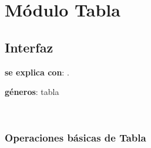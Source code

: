 \section{M\'odulo Tabla}

\subsection{Interfaz}

\textbf{se explica con}: .

\textbf{géneros}: tabla


~


\subsubsection{Operaciones b\'asicas de Tabla}

